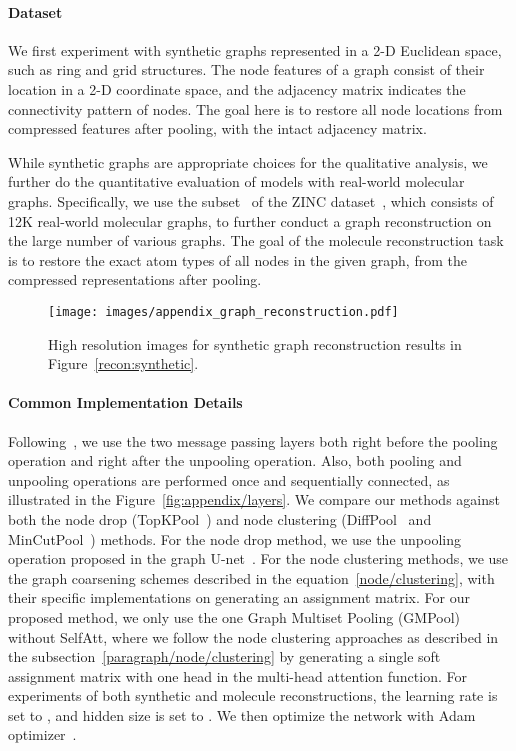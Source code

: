 \documentclass{article} \usepackage{iclr2021_conference,times}
\begin{document}
\paragraph{Dataset}
We first experiment with synthetic graphs represented in a 2-D Euclidean space, such as ring and grid structures. The node features of a graph consist of their location in a 2-D coordinate space, and the adjacency matrix indicates the connectivity pattern of nodes. The goal here is to restore all node locations from compressed features after pooling, with the intact adjacency matrix.

While synthetic graphs are appropriate choices for the qualitative analysis, we further do the quantitative evaluation of models with real-world molecular graphs. Specifically, we use the subset~\citep{benchmarkingGNN} of the ZINC dataset~\citep{ZINC}, which consists of 12K real-world molecular graphs, to further conduct a graph reconstruction on the large number of various graphs. The goal of the molecule reconstruction task is to restore the exact atom types of all nodes in the given graph, from the compressed representations after pooling.

\begin{figure*}[t]
    \centering
    \texttt{[image: images/appendix\_graph\_reconstruction.pdf]}
    \vskip -0.2in
    \caption{High resolution images for synthetic graph reconstruction results in Figure~\ref{recon:synthetic}.}
    \label{fig:appendix/synthetic}
    \vskip -0.15in
\end{figure*}

\paragraph{Common Implementation Details}
Following~\citet{MincutPool}, we use the two message passing layers both right before the pooling operation and right after the unpooling operation. Also, both pooling and unpooling operations are performed once and sequentially connected, as illustrated in the Figure~\ref{fig:appendix/layers}. We compare our methods against both the node drop (TopKPool~\citep{TopKPool}) and node clustering (DiffPool~\citep{DiffPool} and MinCutPool~\citep{MincutPool}) methods. For the node drop method, we use the unpooling operation proposed in the graph U-net~\citep{TopKPool}. For the node clustering methods, we use the graph coarsening schemes described in the equation~\ref{node/clustering}, with their specific implementations on generating an assignment matrix. For our proposed method, we only use the one Graph Multiset Pooling (GMPool) without SelfAtt, where we follow the node clustering approaches as described in the subsection~\ref{paragraph/node/clustering} by generating a single soft assignment matrix with one head  in the multi-head attention function. For experiments of both synthetic and molecule reconstructions, the learning rate is set to , and hidden size is set to . We then optimize the network with Adam optimizer~\citep{kingma2014adam}.
\end{document}
